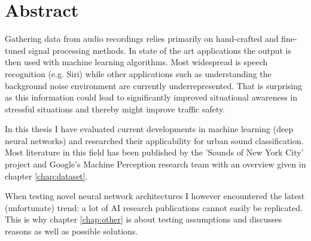 \chapter*{Abstract}

\begin{center}
\begin{minipage}[t]{.8\textwidth}
\setlength{\parskip}{.5\baselineskip}


Gathering data from audio recordings relies primarily on hand-crafted and fine-tuned signal processing methods. In state of the art applications the output is then used with machine learning algorithms. Most widespread is speech recognition (e.g. Siri) while other applications such as understanding the background noise environment are currently underrepresented. That is surprising as this information could lead to significantly improved situational awareness in stressful situations and thereby might improve traffic safety.


In this thesis I have evaluated current developments in machine learning (deep neural networks) and researched their applicability for urban sound classification. Most literature in this field has been published by the 'Sounds of New York City' project and Google's Machine Perception research team with an overview given in chapter \ref{chap:dataset}.
 
When testing novel neural network architectures I however encountered the latest (unfortunate) trend: a lot of AI research publications cannot easily be replicated. This is why chapter \ref{chap:other} is about testing assumptions and discusses reasons as well as possible solutions.

\end{minipage}
\end{center}
